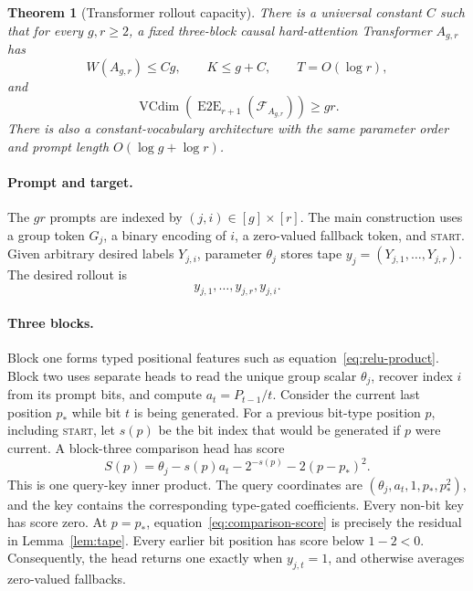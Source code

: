 \documentclass{article}
\newtheorem{theorem}{Theorem}
\newcommand{\1}{\mathbf 1}
\newcommand{\VC}{\operatorname{VCdim}}
\newcommand{\EtoE}{\operatorname{E2E}}
\begin{document}
\begin{theorem}[Transformer rollout capacity]\label{thm:lower}
There is a universal constant $C$ such that for every $g,r\geq2$, a fixed three-block causal hard-attention Transformer $A_{g,r}$ has \[ W(A_{g,r})\leq Cg,\qquad K\leq g+C,\qquad T=O(\log r), \] and
\begin{equation}
 \VC(\EtoE_{r+1}(\mathcal F_{A_{g,r}}))\geq gr.
 \label{eq:main-lower}
\end{equation}
There is also a constant-vocabulary architecture with the same parameter order and prompt length $O(\log g+\log r)$.
\end{theorem}

\paragraph{Prompt and target.}
The $gr$ prompts are indexed by $(j,i)\in[g]\times[r]$. The main construction uses a group token $G_j$, a binary encoding of $i$, a zero-valued fallback token, and \textsc{start}. Given arbitrary desired labels $Y_{j,i}$, parameter $\theta_j$ stores tape $y_j=(Y_{j,1},\ldots,Y_{j,r})$. The desired rollout is
\begin{equation}
 y_{j,1},\ldots,y_{j,r},y_{j,i}.
 \label{eq:desired-rollout}
\end{equation}

\paragraph{Three blocks.}
Block one forms typed positional features such as equation~\eqref{eq:relu-product}. Block two uses separate heads to read the unique group scalar $\theta_j$, recover index $i$ from its prompt bits, and compute $a_t=P_{t-1}/t$. Consider the current last position $p_*$ while bit $t$ is being generated. For a previous bit-type position $p$, including \textsc{start}, let $s(p)$ be the bit index that would be generated if $p$ were current. A block-three comparison head has score
\begin{equation}
 S(p)=\theta_j-s(p)a_t-2^{-s(p)}-2(p-p_*)^2.
 \label{eq:comparison-score}
\end{equation}
This is one query-key inner product. The query coordinates are $(\theta_j,a_t,1,p_*,p_*^2)$, and the key contains the corresponding type-gated coefficients. Every non-bit key has score zero. At $p=p_*$, equation~\eqref{eq:comparison-score} is precisely the residual in Lemma~\ref{lem:tape}. Every earlier bit position has score below $1-2<0$. Consequently, the head returns one exactly when $y_{j,t}=1$, and otherwise averages zero-valued fallbacks.
\end{document}

